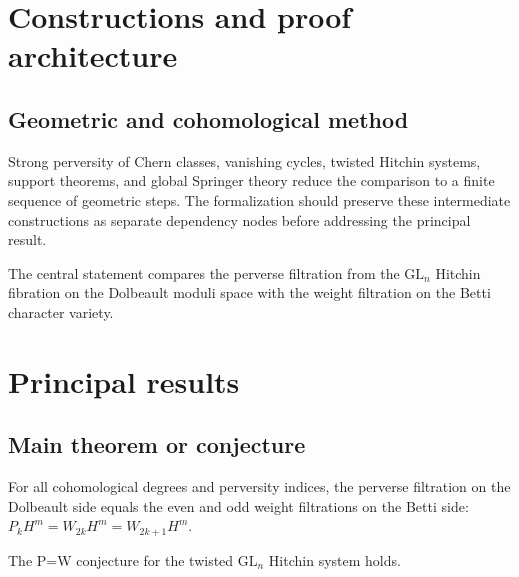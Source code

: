 \chapter{Constructions and proof architecture}
\label{chap:pw-conjecture-gl-n-method}

\section{Geometric and cohomological method}
\label{sec:pw-conjecture-gl-n-method}

Strong perversity of Chern classes, vanishing cycles, twisted Hitchin systems, support theorems, and global Springer theory reduce the comparison to a finite sequence of geometric steps. The formalization should preserve these intermediate constructions
as separate dependency nodes before addressing the principal result.

\begin{definition}[P=W filtration comparison]
\label{pw-conjecture-gl-n-central-object}
The central statement compares the perverse filtration from the $\mathrm{GL}_n$ Hitchin fibration on the Dolbeault moduli space with the weight filtration on the Betti character variety.
\notready
\end{definition}

\chapter{Principal results}
\label{chap:pw-conjecture-gl-n-results}

\section{Main theorem or conjecture}
\label{sec:pw-conjecture-gl-n-results}

\begin{conjecture}[P=W for $\mathrm{GL}_n$]
\label{pw-conjecture-gl-n-main}
For all cohomological degrees and perversity indices, the perverse filtration on the Dolbeault side equals the even and odd weight filtrations on the Betti side: $P_kH^m=W_{2k}H^m=W_{2k+1}H^m$.
\notready
\end{conjecture}

\begin{theorem}[Proof of P=W]
\label{pw-conjecture-gl-n-secondary}
The P=W conjecture for the twisted $\mathrm{GL}_n$ Hitchin system holds.
\notready
\end{theorem}
